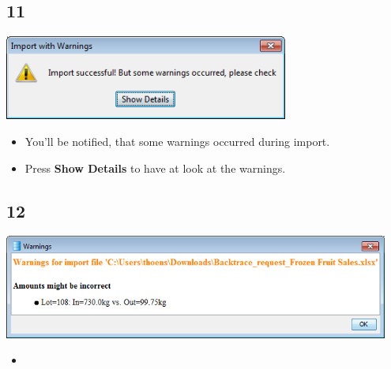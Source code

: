 \documentclass{beamer}
\begin{document}
\subsection{11}
\begin{frame}
	\begin{center}
  		\includegraphics[width=0.7\textwidth]{11.png}
	\end{center}
	\begin{itemize}
		\item You'll be notified, that some warnings occurred during import.
		\item Press \textbf{Show Details} to have at look at the warnings.
	\end{itemize}
\end{frame}

\subsection{12}
\begin{frame}
	\begin{center}
  		\includegraphics[width=0.95\textwidth]{12.png}
	\end{center}
	\begin{itemize}
		\item
	\end{itemize}
\end{frame}
\end{document}
